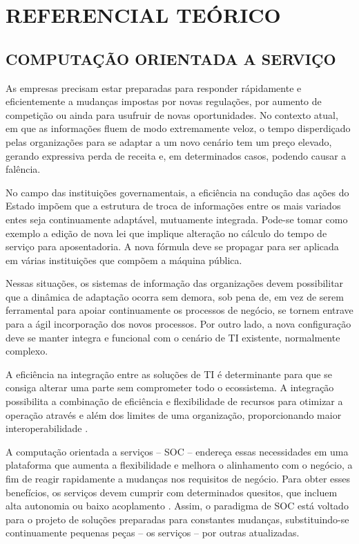  
\chapter{REFERENCIAL TEÓRICO}
\vspace{-6mm}

\section{COMPUTAÇÃO ORIENTADA A SERVIÇO}
\vspace{-6mm}


As empresas precisam estar preparadas para responder rápidamente e
eficientemente a mudanças impostas por novas regulações, por aumento de
competição ou ainda para usufruir de novas oportunidades. No contexto atual, em que as
informações fluem de modo extremamente veloz, o tempo disperdiçado pelas organizações para se
adaptar a um novo cenário tem um preço elevado, gerando expressiva perda de
receita e, em determinados casos, podendo causar a falência.

No campo das instituições governamentais, a eficiência na condução das ações do
Estado impõem que a estrutura de troca de informações entre os mais variados
entes seja continuamente adaptável, mutuamente integrada. Pode-se tomar como
exemplo a edição de nova lei que implique alteração no cálculo do tempo de
serviço para aposentadoria. A nova fórmula deve se propagar para ser
aplicada em várias instituições que compõem a máquina pública.

Nessas situações, os sistemas de informação das organizações devem possibilitar
que a dinâmica de adaptação ocorra sem demora, sob pena de, em vez de serem
ferramental para apoiar continuamente os processos de negócio, se tornem entrave
para a ágil incorporação dos novos processos. Por outro lado, a nova
configuração deve se manter integra e funcional com o cenário de TI existente,
normalmente complexo.

A eficiência na integração entre as soluções de TI é determinante para que se
consiga alterar uma parte sem comprometer todo o ecossistema. A integração
possibilita a combinação de eficiência e flexibilidade de recursos para otimizar
a operação através e além dos limites de uma organização, proporcionando maior
interoperabilidade \cite{papazoglou2008service}.

A computação orientada a serviços -- SOC -- endereça essas necessidades em uma
plataforma que aumenta a flexibilidade e melhora o alinhamento com o negócio, a
fim de reagir rapidamente a mudanças nos requisitos de negócio. Para obter esses
benefícios, os serviços devem cumprir com determinados quesitos, que incluem
alta autonomia ou baixo acoplamento \cite{erl2008soa}. Assim, o paradigma de SOC
está voltado para o projeto de soluções preparadas para constantes mudanças,
substituindo-se continuamente pequenas peças -- os serviços -- por outras
atualizadas.

